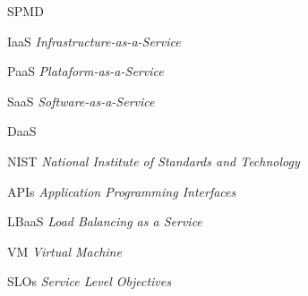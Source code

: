 \documentclass[ti]{texufpel}
\begin{document}
\begin{listofabbrv}{SPMD}
        \item[IaaS] \emph{Infrastructure-as-a-Service}
        \item[PaaS] \emph{Plataform-as-a-Service}
        \item[SaaS] \emph{Software-as-a-Service}
        \item[DaaS] 
        \item[NIST] \emph{National Institute of Standards and Technology}
        \item[APIs] \emph{Application Programming Interfaces}
        \item[LBaaS] \emph{Load Balancing as a Service}
        \item[VM] \emph{Virtual Machine}
        \item[SLOs] \emph{Service Level Objectives}
\end{listofabbrv}

\tableofcontents

 








\annex 
\end{document}
